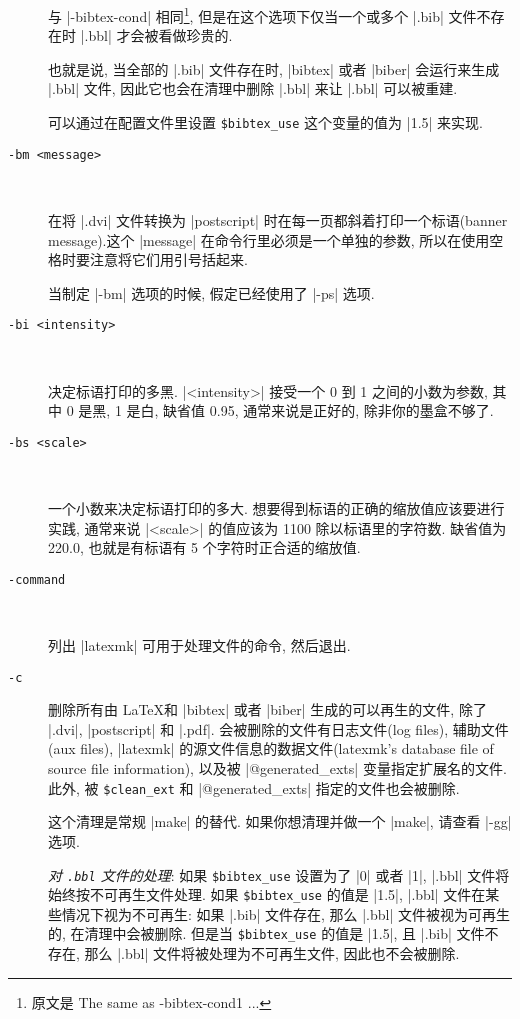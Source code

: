 \documentclass{ctexart}
\begin{document}
\begin{description}
        与 |-bibtex-cond| 相同\footnote{原文是 The same as -bibtex-cond1 ... }, 但是在这个选项下仅当一个或多个 |.bib| 文件不存在时 |.bbl| 才会被看做珍贵的. 
        
        也就是说, 当全部的 |.bib| 文件存在时, |bibtex| 或者 |biber| 会运行来生成 |.bbl| 文件, 因此它也会在清理中删除 |.bbl| 来让 |.bbl| 可以被重建.

        可以通过在配置文件里设置 \verb|$bibtex_use| 这个变量的值为 |1.5| 来实现.

        \item[\texttt{-bm <message>}]~
        
        在将 |.dvi| 文件转换为 |postscript| 时在每一页都斜着打印一个标语(banner message).这个 |message| 在命令行里必须是一个单独的参数, 所以在使用空格时要注意将它们用引号括起来.

        当制定 |-bm| 选项的时候, 假定已经使用了 |-ps| 选项.

        \item[\texttt{-bi <intensity>}]~
        
        决定标语打印的多黑. |<intensity>| 接受一个 0 到 1 之间的小数为参数, 其中 0 是黑, 1 是白, 缺省值 0.95, 通常来说是正好的, 除非你的墨盒不够了.

        \item[\texttt{-bs <scale>}]~
        
        一个小数来决定标语打印的多大. 想要得到标语的正确的缩放值应该要进行实践, 通常来说 |<scale>| 的值应该为 1100 除以标语里的字符数. 缺省值为 220.0, 也就是有标语有 5 个字符时正合适的缩放值.

        \item[\texttt{-command}]~
        
        列出 |latexmk| 可用于处理文件的命令, 然后退出.

        \item[\texttt{-c}] 删除所有由 \LaTeX 和 |bibtex| 或者 |biber| 生成的可以再生的文件, 除了 |.dvi|, |postscript| 和 |.pdf|. 会被删除的文件有日志文件(log files), 辅助文件(aux files), |latexmk| 的源文件信息的数据文件(latexmk's database file of source file information), 以及被 |@generated_exts| 变量指定扩展名的文件. 此外, 被 \verb|$clean_ext| 和 |@generated_exts| 指定的文件也会被删除.
        
        这个清理是常规 |make| 的替代. 如果你想清理并做一个 |make|, 请查看 |-gg| 选项.

        \emph{对 \texttt{.bbl} 文件的处理}: 如果 \verb|$bibtex_use| 设置为了 |0| 或者 |1|, |.bbl| 文件将始终按不可再生文件处理. 如果 \verb|$bibtex_use| 的值是 |1.5|, |.bbl| 文件在某些情况下视为不可再生: 如果 |.bib| 文件存在, 那么 |.bbl| 文件被视为可再生的, 在清理中会被删除. 但是当 \verb|$bibtex_use| 的值是 |1.5|, 且 |.bib| 文件不存在, 那么 |.bbl| 文件将被处理为不可再生文件, 因此也不会被删除.


\end{description}
\end{document}

